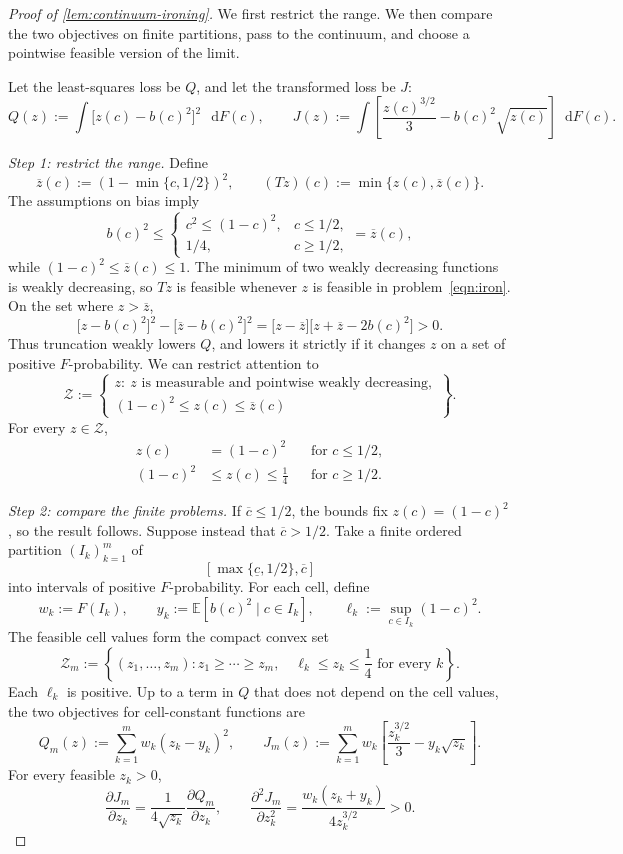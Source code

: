 \documentclass[12pt,reqno]{article}
\newcommand{\de}{\mathop{}\!\mathrm{d}}
\newcommand{\Ex}{\mathbb{E}}
\theoremstyle{definition} \newtheorem{example}{Example}
\theoremstyle{definition} \newtheorem{condition}{Condition}
\theoremstyle{definition} \newtheorem{corollary}{Corollary}
\theoremstyle{definition} \newtheorem{claim}{Claim}
\theoremstyle{definition} \newtheorem{definition}{Definition}
\theoremstyle{definition} \newtheorem{conjecture}{Conjecture}
\theoremstyle{definition} \newtheorem{Lemma}{Lemma}
\theoremstyle{definition} \newtheorem{lemma}{Lemma}
\theoremstyle{plain} \newtheorem{theorem}{Theorem}
\theoremstyle{definition} \newtheorem{assumption}{Assumption}
\theoremstyle{definition} \newtheorem*{assumptionnonumber}{Assumption}
\theoremstyle{definition} \newtheorem*{theoremNoNumber}{Proposition}
\theoremstyle{definition}\newtheorem{proposition}{Proposition}
\theoremstyle{definition} \newtheorem{observation}{Observation}
\theoremstyle{definition} \newtheorem*{definitionNoNumber}{Definition}
\theoremstyle{definition} \newtheorem{Definition}{Definition}
\theoremstyle{definition} \newtheorem*{DefinitionNoNumber}{Definition}
\theoremstyle{definition} \newtheorem*{fact}{Fact}
\theoremstyle{definition} \newtheorem*{property}{Property}
\theoremstyle{definition} \newtheorem{remark}{Remark}
\theoremstyle{definition}\newtheorem{romanexampleinner}{Example}
\begin{document}
\begin{proof}[Proof of \cref{lem:continuum-ironing}]
We first restrict the range. We then compare the two objectives on finite partitions, pass to the continuum, and choose a pointwise feasible version of the limit.

Let the least-squares loss be \(Q\), and let the transformed loss be \(J\):
\[
Q(z)
:=
\int\bigl[z(c)-b(c)^2\bigr]^2\,\de F(c),
\qquad
J(z)
:=
\int\left[
\frac{z(c)^{3/2}}{3}
-b(c)^2\sqrt{z(c)}
\right]\de F(c).
\]

\emph{Step 1: restrict the range.}
Define
\[
\overline z(c)
:=
\left(1-\min\{c,1/2\}\right)^2,
\qquad
(Tz)(c)
:=
\min\{z(c),\overline z(c)\}.
\]
The assumptions on bias imply
\[
b(c)^2
\leq
\begin{cases}
c^2\leq(1-c)^2,&c\leq1/2,\\[3pt]
1/4,&c\geq1/2,
\end{cases}
=
\overline z(c),
\]
while \((1-c)^2\leq\overline z(c)\leq1\). The minimum of two weakly decreasing functions is weakly decreasing, so \(Tz\) is feasible whenever \(z\) is feasible in problem~\eqref{eqn:iron}. On the set where \(z>\overline z\),
\[
\bigl[z-b(c)^2\bigr]^2
-\bigl[\overline z-b(c)^2\bigr]^2
=
\bigl[z-\overline z\bigr]
\bigl[z+\overline z-2b(c)^2\bigr]
>0.
\]
Thus truncation weakly lowers \(Q\), and lowers it strictly if it changes \(z\) on a set of positive \(F\)-probability. We can restrict attention to
\[
\mathcal Z
:=
\left\{
\begin{array}{l}
z:\ z\text{ is measurable and pointwise weakly decreasing},\\
(1-c)^2\leq z(c)\leq\overline z(c)
\end{array}
\right\}.
\]
For every \(z\in\mathcal Z\),
\[
\begin{aligned}
z(c)&=(1-c)^2
&&\text{for }c\leq1/2,\\
(1-c)^2&\leq z(c)\leq\frac14
&&\text{for }c\geq1/2.
\end{aligned}
\]

\emph{Step 2: compare the finite problems.}
If \(\overline c\leq1/2\), the bounds fix \(z(c)=(1-c)^2\), so the result follows. Suppose instead that \(\overline c>1/2\). Take a finite ordered partition \((I_k)_{k=1}^m\) of
\[
\left[\max\{\underline c,1/2\},\overline c\right]
\]
into intervals of positive \(F\)-probability. For each cell, define
\[
w_k:=F(I_k),
\qquad
y_k:=\Ex\!\left[b(c)^2\mid c\in I_k\right],
\qquad
\ell_k:=\sup_{c\in I_k}(1-c)^2.
\]
The feasible cell values form the compact convex set
\[
\mathcal Z_m
:=
\left\{
(z_1,\ldots,z_m):
z_1\geq\cdots\geq z_m,
\quad
\ell_k\leq z_k\leq\frac14
\text{ for every }k
\right\}.
\]
Each \(\ell_k\) is positive. Up to a term in \(Q\) that does not depend on the cell values, the two objectives for cell-constant functions are
\[
Q_m(z)
:=
\sum_{k=1}^m w_k(z_k-y_k)^2,
\qquad
J_m(z)
:=
\sum_{k=1}^m w_k\left[
\frac{z_k^{3/2}}3-y_k\sqrt{z_k}
\right].
\]
For every feasible \(z_k>0\),
\[
\frac{\partial J_m}{\partial z_k}
=\frac{1}{4\sqrt{z_k}}
\frac{\partial Q_m}{\partial z_k},
\qquad
\frac{\partial^2 J_m}{\partial z_k^2}
=\frac{w_k(z_k+y_k)}{4z_k^{3/2}}>0.
\]


\end{proof}
\end{document}
